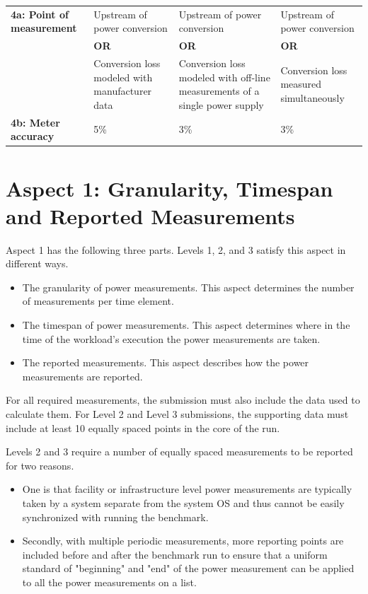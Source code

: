 \begin{table}
\begin{tabular}{|p{3.0cm}|p{3.5cm}|p{3.5cm}|p{3.5cm}|}
\textbf{4a: Point of measurement} &
Upstream of power conversion &
Upstream of power conversion &
Upstream of power conversion\\

 &
\centering \textbf{OR} &
\centering \textbf{OR} &
\centering \textbf{OR} \tabularnewline

 &
Conversion loss modeled with manufacturer data &
Conversion loss modeled with off-line measurements of a single power supply &
Conversion loss measured simultaneously \\
\hline
\textbf{4b: Meter accuracy} &
5\% &
3\% &
3\% \\
\hline
\end{tabular}
\end{table}

\section{Aspect 1: Granularity, Timespan and Reported Measurements}
\label{sec:A1GTRM}
\noindent
Aspect 1 has the following three parts. Levels 1, 2, and 3 satisfy this aspect in different ways.

\begin{itemize}
\item
The granularity of power measurements. This aspect determines the number of measurements per time element.
\item
The timespan of power measurements. This aspect determines where in the time of the workload's execution the power measurements are taken.
\item
The reported measurements. This aspect describes how the power measurements are reported.
\end{itemize}

\noindent
For all required measurements, the submission must also include the data used to calculate them. For Level 2 and Level 3 submissions, the supporting data must include at least 10 equally spaced points in the core of the run. 
\wl

\noindent
Levels 2 and 3 require a number of equally spaced measurements to be reported for two reasons.  

\begin{itemize}
\item
One is that facility or infrastructure level power measurements are typically taken by a system separate from the system OS and thus cannot be easily synchronized with running the benchmark.  
\item
Secondly, with multiple periodic measurements, more reporting points are included before and after the benchmark run to ensure that a uniform standard of "beginning" and "end" of the power measurement can be applied to all the power measurements on a list.  
\end{itemize}

